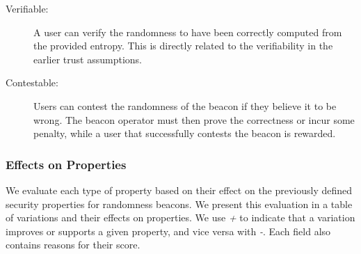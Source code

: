 \begin{description}
    \item[Verifiable:]
        A user can verify the randomness to have been correctly computed from the provided entropy.
        This is directly related to the verifiability in the earlier trust assumptions.

    \item[Contestable:]
        Users can contest the randomness of the beacon if they believe it to be wrong.
        The beacon operator must then prove the correctness or incur some penalty, while a user that successfully contests the beacon is rewarded. 
\end{description}

\subsubsection{Effects on Properties}
We evaluate each type of property based on their effect on the previously defined security properties for randomness beacons. We present this evaluation in a table of variations and their effects on properties. We use \emph{+} to indicate that a variation improves or supports a given property, and vice versa with \emph{-}. Each field also contains reasons for their score. 


